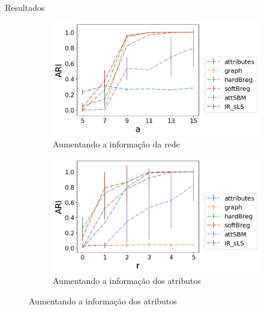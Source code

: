 \documentclass[aspectratio=169]{beamer}
\begin{document}
\begin{frame}{Resultados}


\hspace*{10px}
    \begin{figure}[!ht]
    \centering
     \begin{subfigure}[b]{0.45\textwidth}
    \includegraphics[width=\textwidth]{img/varying_a.png}
    \caption{Aumentando a informação da rede}
    \end{subfigure}
    \hfill
    \begin{subfigure}[b]{0.45\textwidth}
    \includegraphics[width=\textwidth]{img/varying_r.png}
    \caption{Aumentando a informação dos atributos}
    \end{subfigure}
\end{figure}
\end{frame}
\end{document}
